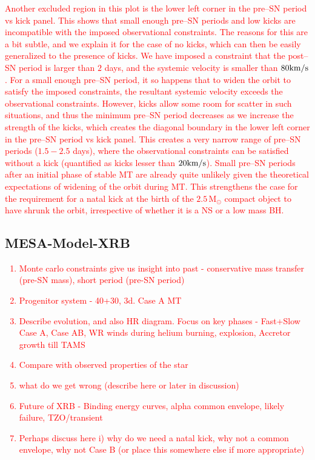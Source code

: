 \documentclass[linenumbers,trackchanges,twocolumn]{aastex701}
\newcommand{\Mdot}{\mathrm{M}_{\odot}}
\newcommand{\red}{\textcolor{red}}
\begin{document}
\red{Another excluded region in this plot is the lower left corner in the pre--SN period vs kick panel. This shows that small enough pre--SN periods and low kicks are incompatible with the imposed observational constraints. The reasons for this are a bit subtle, and we explain it for the case of no kicks, which can then be easily generalized to the presence of kicks. We have imposed a constraint that the post--SN period is larger than $2$ days, and the systemic velocity is smaller than $80\rm km/s$. For a small enough pre--SN period, it so happens that to widen the orbit to satisfy the imposed constraints, the resultant systemic velocity exceeds the observational constraints. However, kicks allow some room for scatter in such situations, and thus the minimum pre--SN period decreases as we increase the strength of the kicks, which creates the diagonal boundary in the lower left corner in the pre--SN period vs kick panel.
This creates a very narrow range of pre--SN periods ($1.5-2.5$ days), where the observational constraints can be satisfied without a kick (quantified as kicks lesser than $20 \rm km/s$). Small pre--SN periods after an initial phase of stable MT are already quite unlikely given the theoretical expectations of widening of the orbit during MT. This strengthens the case for the requirement for a natal kick at the birth of the $2.5 \,\Mdot$ compact object to have shrunk the orbit, irrespective of whether it is a NS or a low mass BH.}

\subsection{MESA-Model-XRB}

\red{
\begin{enumerate}
    \item Monte carlo constraints give us insight into past - conservative mass transfer (pre-SN mass), short period (pre-SN period)
    \item Progenitor system - 40+30, 3d. Case A MT
    \item Describe evolution, and also HR diagram. Focus on key phases - Fast+Slow Case A, Case AB, WR winds during helium burning, explosion, Accretor growth till TAMS
    \item Compare with observed properties of the star
    \item what do we get wrong (describe here or later in discussion)
    \item Future of XRB - Binding energy curves, alpha common envelope, likely failure, TZO/transient
    \item Perhaps discuss here i) why do we need a natal kick, why not a common envelope, why not Case B (or place this somewhere else if more appropriate)
\end{enumerate}
}
\end{document}
